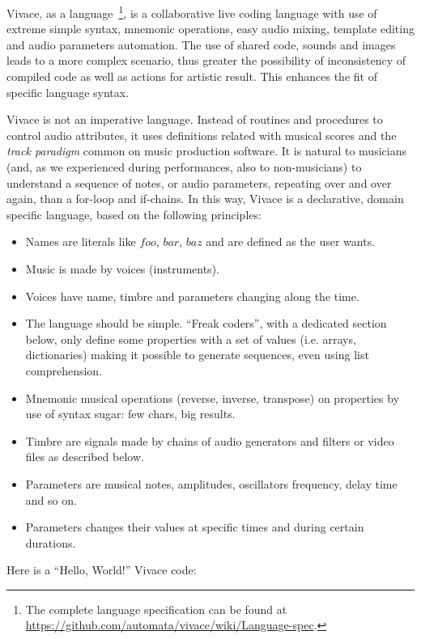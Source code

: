 \documentclass[letterpaper, 12pt]{article}
\begin{document}
Vivace, as a language~\footnote{The complete language specification
  can be found at
  \url{https://github.com/automata/vivace/wiki/Language-spec}.}, is a
collaborative live coding language with use of extreme simple syntax,
mnemonic operations, easy audio mixing, template editing and audio
parameters automation. The use of shared code, sounds and images leads
to a more complex scenario, thus greater the possibility of
inconsistency of compiled code as well as actions for artistic
result. This enhances the fit of specific language syntax.

Vivace is not an imperative language. Instead of routines and
procedures to control audio attributes, it uses definitions related
with musical scores and the \emph{track paradigm} common on music
production software. It is natural to musicians (and, as we
experienced during performances, also to non-musicians) to understand
a sequence of notes, or audio parameters, repeating over and over
again, than a for-loop and if-chains. In this way, Vivace is a
declarative, domain specific language, based on the following
principles:

\begin{itemize}
  
\item Names are literals like $foo$, $bar$, $baz$ and are defined as
  the user wants.
\item Music is made by voices (instruments).
\item Voices have name, timbre and parameters changing along the time.
\item The language should be simple. ``Freak coders'', with a
  dedicated section below, only define some properties with a set of
  values (i.e. arrays, dictionaries) making it possible to generate
  sequences, even using list comprehension.
\item Mnemonic musical operations (reverse, inverse, transpose) on
  properties by use of syntax sugar: few chars, big results.
\item Timbre are signals made by chains of audio generators and
  filters or video files as described below.
\item Parameters are musical notes, amplitudes, oscillators frequency,
  delay time and so on.
\item Parameters changes their values at specific times and during
  certain durations.

\end{itemize}

Here is a ``Hello, World!'' Vivace code:
\end{document}
